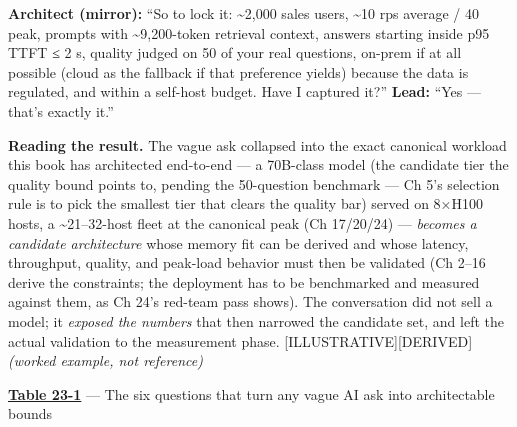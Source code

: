 \textbf{Architect (mirror):} ``So to lock it: \textasciitilde2,000 sales
users, \textasciitilde10 rps average / 40 peak, prompts with
\textasciitilde9,200-token retrieval context, answers starting inside
p95 TTFT ≤ 2 s, quality judged on 50 of your real questions, on-prem if
at all possible (cloud as the fallback if that preference yields)
because the data is regulated, and within a self-host budget. Have I
captured it?'' \textbf{Lead:} ``Yes --- that's exactly it.''

\textbf{Reading the result.} The vague ask collapsed into the exact
canonical workload this book has architected end-to-end --- a 70B-class
model (the candidate tier the quality bound points to, pending the
50-question benchmark --- Ch 5's selection rule is to pick the smallest
tier that clears the quality bar) served on 8×H100 hosts, a
\textasciitilde21--32-host fleet at the canonical peak (Ch 17/20/24) ---
\emph{becomes a candidate architecture} whose memory fit can be derived
and whose latency, throughput, quality, and peak-load behavior must then
be validated (Ch 2--16 derive the constraints; the deployment has to be
benchmarked and measured against them, as Ch 24's red-team pass shows).
The conversation did not sell a model; it \emph{exposed the numbers}
that then narrowed the candidate set, and left the actual validation to
the measurement phase. \mbox{{[}ILLUSTRATIVE{]}}\hspace{0pt}\mbox{{[}DERIVED{]}} \emph{(worked
example, not reference)}

\textbf{\hyperref[tab:23.1]{Table 23-1}} --- The six questions that turn any vague AI ask
into architectable bounds

